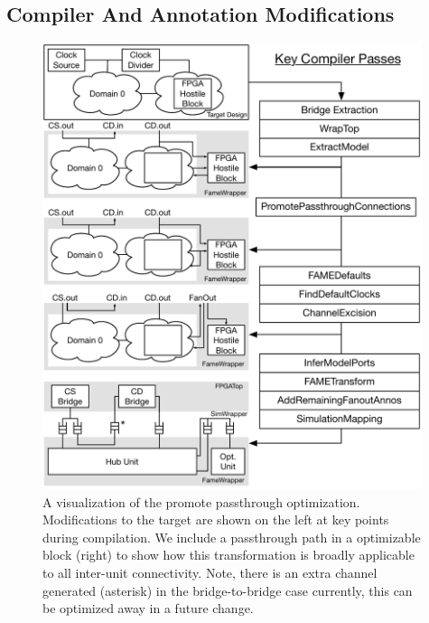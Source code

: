 \subsection{Compiler And Annotation Modifications}\label{sec:pdes-compiler-modifications}

\begin{figure}
    \centering
    \includegraphics[width=0.99\textwidth]{figures/promote-passthroughs.pdf}
    \caption{A visualization of the promote passthrough optimization.
    Modifications to the target are shown on the left at key points during
    compilation. We include a passthrough path in a optimizable block (right)
    to show how this transformation is broadly applicable to all inter-unit
    connectivity. Note, there is an extra channel generated (asterisk) in the
    bridge-to-bridge case currently, this can be optimized away in a future change.}
    \label{fig:promote-passthroughs}
\end{figure}

